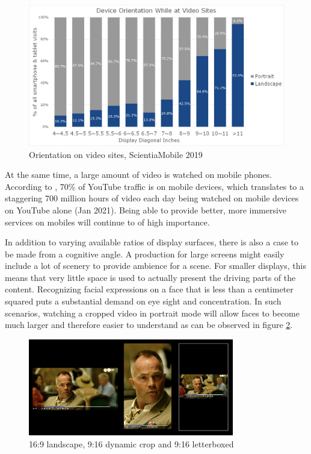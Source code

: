 \documentclass[sigconf, review=false]{acmart}
\begin{document}
\begin{figure}
  \begin{center}
    \includegraphics[width=0.9\columnwidth]
     {device-orientation-by-diagonal-size-video-sites-v2.png}
  \end{center}
  \caption{Orientation on video sites, ScientiaMobile 2019}
  \label{scientiamobile}
\end{figure}

At the same time, a large amount of video is watched on mobile phones.
According to \cite{hootsuite}, 70\% of YouTube traffic is on mobile devices,
which translates to a staggering 700 million hours of video each day being
watched on mobile devices on YouTube alone (Jan 2021). Being able to provide
better, more immersive services on mobiles will continue to of high
importance.

In addition to varying available ratios of display surfaces, there is also a
case to be made from a cognitive angle. A production for large screens might
easily include a lot of scenery to provide ambience for a scene. For smaller
displays, this means that very little space is used to actually present the
driving parts of the content. Recognizing facial expressions on a face that
is less than a centimeter squared puts a substantial demand on eye sight and
concentration. In such scenarios, watching a cropped video in portrait mode
will allow faces to become much larger and therefore easier to understand as
can be observed in figure \ref{croppings}.

\begin{figure}
  \begin{center}
    \includegraphics[width=0.8\textwidth]{DAR_vs_letterbox.png}
  \end{center}
  \caption{16:9 landscape, 9:16 dynamic crop and 9:16 letterboxed}
  \label{croppings}
\end{figure}
\end{document}
